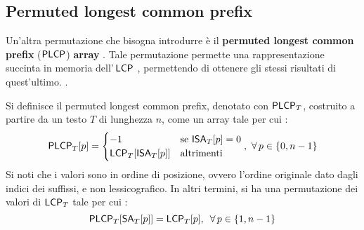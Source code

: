 \subsection{Permuted longest common prefix}
Un'altra permutazione che bisogna introdurre è il \textbf{permuted
  longest common prefix} ($\mbox{\rm {\sf PLCP}}$) \textbf{array} \cite{plcp}.
Tale permutazione
permette una rappresentazione succinta in memoria dell'$\,\mbox{\rm {\sf LCP}}$ \cite{plcp2},
permettendo di ottenere gli stessi risultati di quest'ultimo.
.
\begin{definizione}
  Si definisce il permuted longest common prefix, denotato con
  $\mbox{\rm {\sf PLCP}}_T$, costruito a partire da un testo $T$ di lunghezza $n$, come un
  array tale per cui \cite{phoni}:
  \begin{equation}
    \label{eq:plcpdef1}
    \mbox{\rm {\sf PLCP}}_T[p]=
    \begin{cases}
      -1&\mbox{se }\mbox{\rm {\sf ISA}}_T[p]=0\\
     \mbox{\rm {\sf LCP}}_T[\mbox{\rm {\sf ISA}}_T[p]]&\mbox{altrimenti}
    \end{cases},\,\,\forall\, p\in\{0,n-1\}
  \end{equation}
  Si noti che i valori sono in ordine di posizione, ovvero l'ordine originale
  dato dagli indici dei suffissi, e non
  lessicografico. In altri termini, si ha una permutazione dei valori di $\mbox{\rm {\sf LCP}}_T$
  tale per cui \cite{plcp}:
  \begin{equation}
    \label{eq:plcpdef2}
    \mbox{\rm {\sf PLCP}}_T[\mbox{\rm {\sf SA}}_T[p]] = \mbox{\rm {\sf LCP}}_T[p],\,\,\,\forall\, p\in\{1,n-1\}
  \end{equation}
\end{definizione}
